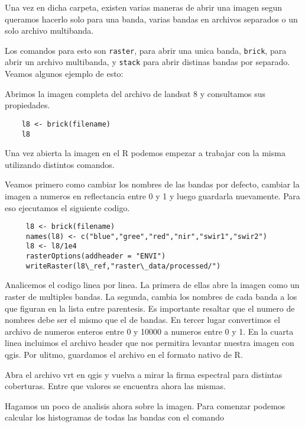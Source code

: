\documentclass[a4paper]{article}
\begin{document}
 Una vez en dicha carpeta, existen varias maneras de abrir una imagen segun
 queramos hacerlo solo para una banda, varias bandas en archivos separados o un
 solo archivo multibanda.

 Los comandos para esto son \texttt{raster}, para abrir una unica banda,
 \texttt{brick}, para abrir un archivo multibanda, y \texttt{stack} para abrir
 distinas bandas por separado. Veamos algunos ejemplo de esto:

 \begin{exa}
    Abrimos la imagen completa del archivo de landsat 8 y consultamos sus 
    propiedades.
 \begin{lstlisting}
    l8 <- brick(filename)
    l8
 \end{lstlisting}
 \end{exa}


 Una vez abierta la imagen en el R podemos empezar a trabajar con la misma
 utilizando distintos comandos. 

 Veamos primero como cambiar los nombres de las bandas por defecto, cambiar la
 imagen a numeros en reflectancia entre 0 y 1 y luego guardarla nuevamente. Para
 eso ejecutamos el siguiente codigo.

 \begin{lstlisting}
     l8 <- brick(filename)
     names(l8) <- c("blue","gree","red","nir","swir1","swir2")
     l8 <- l8/1e4
     rasterOptions(addheader = "ENVI")
     writeRaster(l8\_ref,"raster\_data/processed/")
 \end{lstlisting}

 Analicemos el codigo linea por linea. La primera de ellas abre la imagen como
 un raster de multiples bandas. La segunda, cambia los nombres de cada banda a
 los que figuran en la lista entre parentesis. Es importante resaltar que el
 numero de nombres debe ser el mismo que el de bandas. En tercer lugar
 convertimos el archivo de numeros enteros entre 0 y 10000 a numeros entre 0 y
 1. En la cuarta linea incluimos el archivo header que nos permitira levantar
 nuestra imagen con qgis. Por ulitmo, guardamos el archivo en el formato nativo
 de R.
 
 \begin{act} 
    Abra el archivo vrt en qgis y vuelva a mirar la firma espectral para 
    distintas coberturas. Entre que valores se encuentra ahora las mismas.
 \end{act}

 Hagamos un poco de analisis ahora sobre la imagen. Para comenzar podemos
 calcular los histogramas de todas las bandas con el comando
\end{document}
